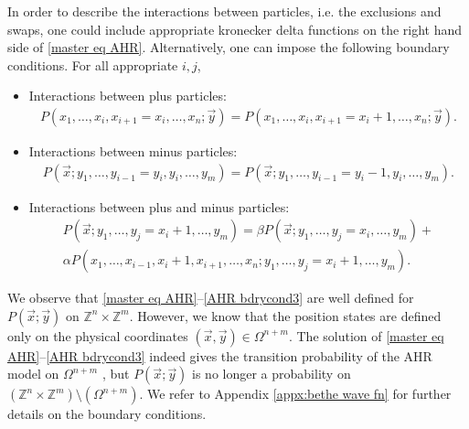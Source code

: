 \documentclass[cmp]{svjour}
\numberwithin{theorem}{section}
\numberwithin{equation}{section}
\begin{document}
In order to describe the interactions between particles, i.e. the exclusions and swaps, one could include appropriate kronecker delta functions on the right hand side of \eqref{master eq AHR}. Alternatively, one can impose the following boundary conditions. For all appropriate $i,j$,
\begin{itemize}
  \item Interactions between plus particles:
  \begin{align}\label{AHR bdrycond1}
  P(x_1,\dots,x_i,x_{i+1}=x_{i},\dots,x_n;\vec{y})
  =
  P(x_1,\dots,x_i,x_{i+1}=x_{i}+1,\dots,x_n;\vec{y}).
  \end{align}
  \item Interactions between minus particles:
  \begin{align}\label{AHR bdrycond2}
  P(\vec{x};y_1,\dots,y_{i-1}=y_i,y_i,\dots,y_m)
  =
  P(\vec{x};y_1,\dots,y_{i-1}=y_i-1,y_i,\dots,y_m).
  \end{align}
  \item Interactions between plus and minus particles:
  \begin{equation}\label{AHR bdrycond3}
  \begin{split}
  P(\vec{x};
  y_1,\dots,y_j=x_i+1,\dots,y_m)
  =
  \beta P(\vec{x};
  y_1,\dots,y_j=x_i,\dots,y_m)+\\
  \alpha P(x_1,\dots,x_{i-1},x_i+1,x_{i+1},\dots,x_n;
  y_1,\dots,y_j=x_i+1,\dots,y_m).
  \end{split}
  \end{equation}
\end{itemize}


We observe that \eqref{master eq AHR}--\eqref{AHR bdrycond3} are well defined for $P(\vec{x};\vec{y})$ on $\mathbb{Z}^n\times\mathbb{Z}^m$. However, we know that the position states are defined only on the physical coordinates $(\vec{x},\vec{y})\in \Omega^{n+m}$. The solution of \eqref{master eq AHR}--\eqref{AHR bdrycond3} indeed gives the transition probability of the AHR model on $\Omega^{n+m}$ , but $P(\vec{x};\vec{y})$ is no longer a probability on $(\mathbb{Z}^n\times\mathbb{Z}^m) \setminus(\Omega^{n+m})$. We refer to Appendix \ref{appx:bethe wave fn} for further details on the boundary conditions.
\end{document}
